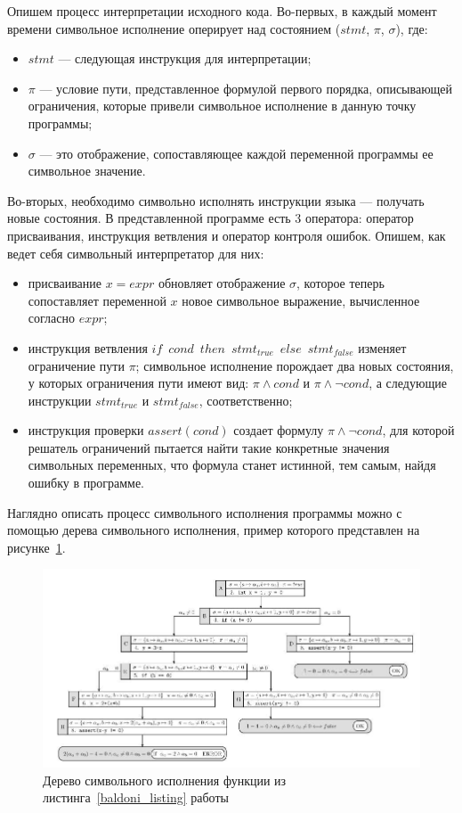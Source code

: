 Опишем процесс интерпретации исходного кода.
Во-первых, в каждый момент времени символьное исполнение оперирует над состоянием ($stmt$, $\pi$, $\sigma$), где:
\begin{itemize}
    \item $stmt$ --- следующая инструкция для интерпретации;
    \item $\pi$ --- условие пути, представленное формулой первого порядка, описывающей ограничения, которые привели символьное исполнение в данную точку программы;
    \item $\sigma$ --- это отображение, сопоставляющее каждой переменной программы ее символьное значение.
\end{itemize}
Во-вторых, необходимо символьно исполнять инструкции языка --- получать новые состояния. 
В представленной программе есть 3 оператора: оператор присваивания, инструкция ветвления и оператор контроля ошибок. 
Опишем, как ведет себя символьный интерпретатор для них:
\begin{itemize}
    \item присваивание $x = expr$ обновляет отображение $\sigma$, которое теперь сопоставляет переменной $x$ новое символьное выражение, вычисленное согласно $expr$;
    \item инструкция ветвления $if$~$cond$~$then$~$stmt_{true}$~$else$~$stmt_{false}$ изменяет ограничение пути $\pi$; символьное исполнение порождает два новых состояния, у которых ограничения пути имеют вид: $\pi \land cond$ и $\pi \land \neg cond$, а следующие инструкции $stmt_{true}$ и $stmt_{false}$, соответственно;
    \item инструкция проверки $assert(cond)$ создает формулу $\pi \land \neg cond$, для которой решатель ограничений пытается найти такие конкретные значения символьных переменных, что формула  станет истинной, тем самым, найдя ошибку в программе.
\end{itemize}

Наглядно описать процесс символьного исполнения программы можно с помощью дерева символьного исполнения, пример которого представлен на рисунке~\ref{exec-tree}.

\begin{figure}
\centering
\includegraphics[scale=0.55]{Batoev/images/sym_ex_tree.jpg}
\caption{Дерево символьного исполнения функции из листинга~\ref{baldoni_listing} работы~\cite{baldoni2018survey}}
\label{exec-tree}
\end{figure}

